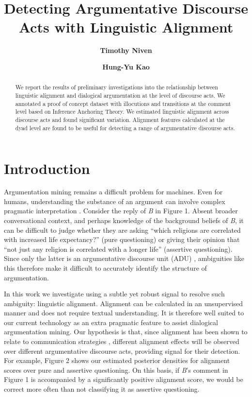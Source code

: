 \documentclass[11pt,a4paper]{article}
\title{Detecting Argumentative Discourse Acts with Linguistic Alignment}
\author{\textbf{Timothy Niven}}
\author{\textbf{Hung-Yu Kao}}
\affil{Intelligent Knowledge Management Lab \\
  Department of Computer Science and Information Engineering \\
  National Cheng Kung University \\
  Tainan, Taiwan \\
  \texttt{tim.niven.public@gmail.com}, \texttt{hykao@mail.ncku.edu.tw}}
\date{}
\begin{document}
\maketitle
\begin{abstract}
  We report the results of preliminary investigations into the relationship between linguistic alignment and dialogical argumentation at the level of discourse acts. We annotated a proof of concept dataset with illocutions and transitions at the comment level based on Inference Anchoring Theory. We estimated linguistic alignment across discourse acts and found significant variation. Alignment features calculated at the dyad level are found to be useful for detecting a range of argumentative discourse acts.
\end{abstract}

%

\section{Introduction}

Argumentation mining remains a difficult problem for machines. Even for humans, understanding the substance of an argument can involve complex pragmatic interpretation \cite{Cohen87}. Consider the reply of \textit{B} in Figure 1. Absent broader conversational context, and perhaps knowledge of the background beliefs of \textit{B}, it can be difficult to judge whether they are asking ``which religions are correlated with increased life expectancy?'' (pure questioning) or giving their opinion that ``not just any religion is correlated with a longer life'' (assertive questioning). Since only the latter is an argumentative discourse unit (ADU) \cite{Stede13}, ambiguities like this therefore make it difficult to accurately identify the structure of argumentation.

In this work we investigate using a subtle yet robust signal to resolve such ambiguity: linguistic alignment. Alignment can be calculated in an unsupervised manner and does not require textual understanding. It is therefore well suited to our current technology as an extra pragmatic feature to assist dialogical argumentation mining. Our hypothesis is that, since alignment has been shown to relate to communication strategies \cite{DoyleF16}, different alignment effects will be observed over different argumentative discourse acts, providing signal for their detection. For example, Figure 2 shows our estimated posterior densities for alignment scores over pure and assertive questioning. On this basis, if \textit{B}'s comment in Figure 1 is accompanied by a significantly positive alignment score, we would be correct more often than not classifying it as assertive questioning.
\end{document}
